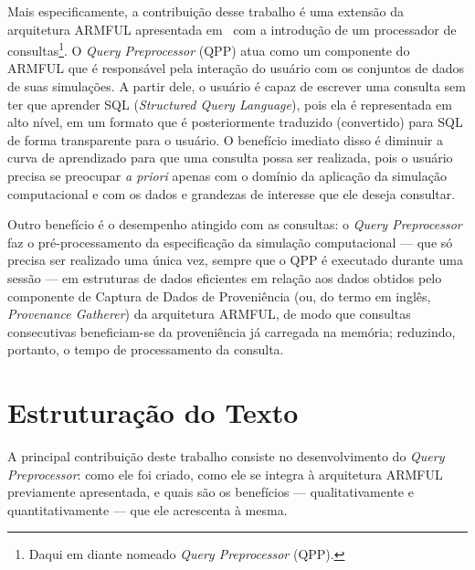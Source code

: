 Mais especificamente, a contribuição desse trabalho é uma extensão da arquitetura ARMFUL apresentada em~\cite{silva2016situ,silva2017raw} com a introdução de um processador de consultas\footnote{Daqui em diante nomeado \textit{Query Preprocessor} (QPP).}.
O  \textit{Query Preprocessor} (QPP) atua como um componente do ARMFUL que é responsável pela interação do usuário com os conjuntos de dados de suas simulações. A partir dele, o usuário é capaz de escrever uma consulta sem ter que aprender  SQL (\textit{Structured Query Language}), pois ela é representada em alto nível, em um formato que é posteriormente traduzido (convertido) para SQL de forma transparente para o usuário. O benefício imediato disso é diminuir a curva de aprendizado para que uma consulta possa ser realizada, pois o usuário precisa se preocupar \textit{a priori} apenas com o domínio da aplicação da simulação computacional e com os dados e grandezas de interesse que ele deseja consultar.

Outro benefício é o desempenho atingido com as consultas: o \textit{Query Preprocessor} faz o pré-processamento da especificação da simulação computacional --- que só precisa ser realizado uma única vez, sempre que o QPP é executado durante uma sessão --- em estruturas de dados eficientes em relação aos dados obtidos pelo componente de Captura de Dados de Proveniência (ou, do termo em inglês, \textit{Provenance Gatherer}) da arquitetura ARMFUL, de modo que consultas consecutivas beneficiam-se da proveniência já carregada na memória; reduzindo, portanto, o tempo de processamento da consulta.

\section{Estruturação do Texto}

A principal contribuição deste trabalho consiste no desenvolvimento do \textit{Query Preprocessor}: como ele foi criado, como ele se integra à arquitetura ARMFUL previamente apresentada, e quais são os benefícios --- qualitativamente e quantitativamente --- que ele acrescenta à mesma.

